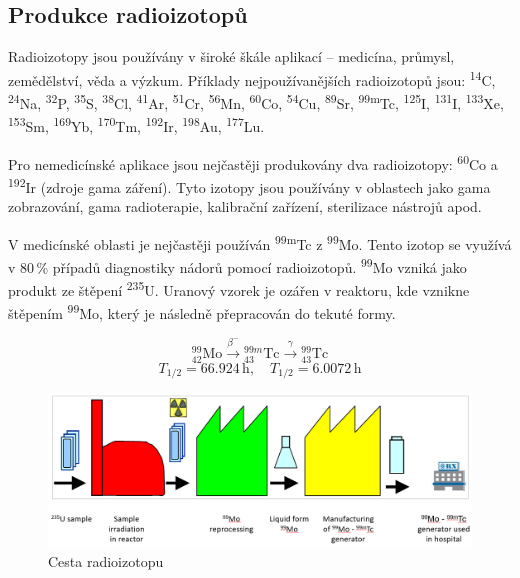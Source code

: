 \subsection{Produkce radioizotopů}

Radioizotopy jsou používány v široké škále aplikací -- medicína, průmysl, zemědělství, věda a výzkum. Příklady nejpoužívanějších radioizotopů jsou:
\textsuperscript{14}C, \textsuperscript{24}Na, \textsuperscript{32}P, \textsuperscript{35}S, \textsuperscript{38}Cl, \textsuperscript{41}Ar, \textsuperscript{51}Cr, \textsuperscript{56}Mn, \textsuperscript{60}Co, \textsuperscript{54}Cu, \textsuperscript{89}Sr, \textsuperscript{99m}Tc, \textsuperscript{125}I, \textsuperscript{131}I, \textsuperscript{133}Xe, \textsuperscript{153}Sm, \textsuperscript{169}Yb, \textsuperscript{170}Tm, \textsuperscript{192}Ir, \textsuperscript{198}Au, \textsuperscript{177}Lu.

Pro nemedicínské aplikace jsou nejčastěji produkovány dva radioizotopy: \textsuperscript{60}Co a \textsuperscript{192}Ir (zdroje gama záření). Tyto izotopy jsou používány v oblastech jako gama zobrazování, gama radioterapie, kalibrační zařízení, sterilizace nástrojů apod. 

V medicínské oblasti je nejčastěji používán \textsuperscript{99m}Tc z \textsuperscript{99}Mo. Tento izotop se využívá v 80\,\% případů diagnostiky nádorů pomocí radioizotopů. \textsuperscript{99}Mo vzniká jako produkt ze štěpení \textsuperscript{235}U. Uranový vzorek je ozářen v reaktoru, kde vznikne štěpením \textsuperscript{99}Mo, který je následně přepracován do tekuté formy.

    \[
        {}^{99}_{42}\mathrm{Mo} \xrightarrow{\beta^-} {}^{99m}_{43}\mathrm{Tc} \xrightarrow{\gamma} {}^{99}_{43}\mathrm{Tc}
    \]
    \[
        T_{1/2} = 66.924\,\mathrm{h}, \quad T_{1/2} = 6.0072\,\mathrm{h}
    \]

\begin{figure}[H]
    \centering
    \includegraphics[width=0.7\linewidth]{img/CestaRadioizotopu.png}
    \caption{Cesta radioizotopu}
    \label{fig:enter-label}
\end{figure}

